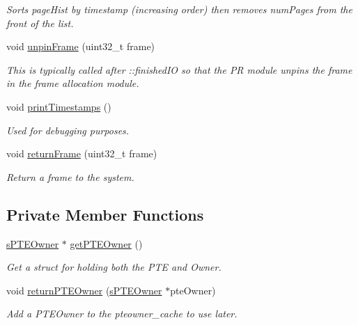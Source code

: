 \begin{DoxyCompactItemize}
\begin{DoxyCompactList}\small\item\em \-Sorts page\-Hist by timestamp (increasing order) then removes num\-Pages from the front of the list. \end{DoxyCompactList}\item 
\hypertarget{classcPRLru_a6ab14eaa8e52cf40ca9921bad685d1d2}{void \hyperlink{classcPRLru_a6ab14eaa8e52cf40ca9921bad685d1d2}{unpin\-Frame} (uint32\-\_\-t frame)}\label{da/da5/classcPRLru_a6ab14eaa8e52cf40ca9921bad685d1d2}

\begin{DoxyCompactList}\small\item\em \-This is typically called after \-::finished\-I\-O so that the \-P\-R module unpins the frame in the frame allocation module. \end{DoxyCompactList}\item 
void \hyperlink{classcPRLru_a9ab0ecc8f28bb2643bfe06cc11f4abb7}{print\-Timestamps} ()
\begin{DoxyCompactList}\small\item\em \-Used for debugging purposes. \end{DoxyCompactList}\item 
void \hyperlink{classcPRLru_a50542682b40a9a5fc48506a347e70c53}{return\-Frame} (uint32\-\_\-t frame)
\begin{DoxyCompactList}\small\item\em \-Return a frame to the system. \end{DoxyCompactList}\end{DoxyCompactItemize}
\subsection*{\-Private \-Member \-Functions}
\begin{DoxyCompactItemize}
\item 
\hyperlink{structsPTEOwner}{s\-P\-T\-E\-Owner} $\ast$ \hyperlink{classcPRLru_a87be0bcf2c296b41d66f3a419d53fa98}{get\-P\-T\-E\-Owner} ()
\begin{DoxyCompactList}\small\item\em \-Get a struct for holding both the \-P\-T\-E and \-Owner. \end{DoxyCompactList}\item 
\hypertarget{classcPRLru_a892e3d84ca361766506ed3615d3dddd8}{void \hyperlink{classcPRLru_a892e3d84ca361766506ed3615d3dddd8}{return\-P\-T\-E\-Owner} (\hyperlink{structsPTEOwner}{s\-P\-T\-E\-Owner} $\ast$pte\-Owner)}\label{da/da5/classcPRLru_a892e3d84ca361766506ed3615d3dddd8}

\begin{DoxyCompactList}\small\item\em \-Add a \-P\-T\-E\-Owner to the pteowner\-\_\-cache to use later. \end{DoxyCompactList}\end{DoxyCompactItemize}
